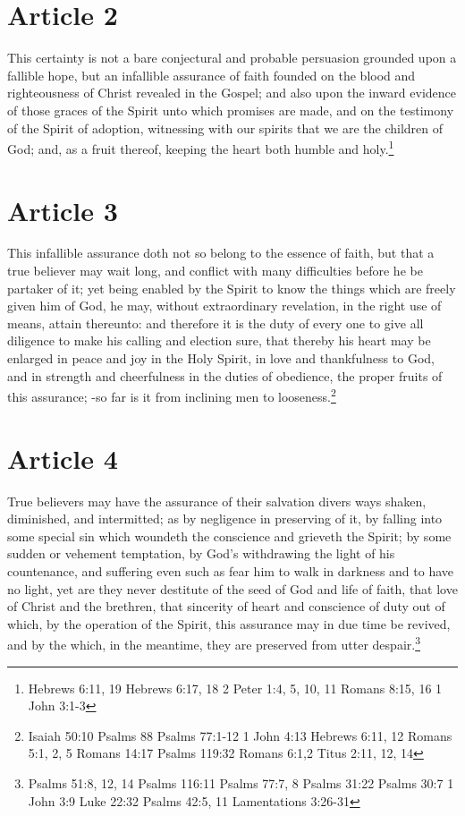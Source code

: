 \documentclass[12pt,letterpaper]{book}
\begin{document}
\section{Article 2}

This certainty is not a bare conjectural and probable persuasion grounded upon a fallible hope, but an infallible assurance of faith founded on the blood and righteousness of Christ revealed in the Gospel; and also upon the inward evidence of those graces of the Spirit unto which promises are made, and on the testimony of the Spirit of adoption, witnessing with our spirits that we are the children of God; and, as a fruit thereof, keeping the heart both humble and holy.\footnote{Hebrews 6:11, 19 Hebrews 6:17, 18 2 Peter 1:4, 5, 10, 11 Romans 8:15, 16 1 John 3:1-3}

\section{Article 3}

This infallible assurance doth not so belong to the essence of faith, but that a true believer may wait long, and conflict with many difficulties before he be partaker of it; yet being enabled by the Spirit to know the things which are freely given him of God, he may, without extraordinary revelation, in the right use of means, attain thereunto: and therefore it is the duty of every one to give all diligence to make his calling and election sure, that thereby his heart may be enlarged in peace and joy in the Holy Spirit, in love and thankfulness to God, and in strength and cheerfulness in the duties of obedience, the proper fruits of this assurance; -so far is it from inclining men to looseness.\footnote{Isaiah 50:10 Psalms 88 Psalms 77:1-12 1 John 4:13 Hebrews 6:11, 12 Romans 5:1, 2, 5 Romans 14:17 Psalms 119:32 Romans 6:1,2 Titus 2:11, 12, 14}

\section{Article 4}

True believers may have the assurance of their salvation divers ways shaken, diminished, and intermitted; as by negligence in preserving of it, by falling into some special sin which woundeth the conscience and grieveth the Spirit; by some sudden or vehement temptation, by God's withdrawing the light of his countenance, and suffering even such as fear him to walk in darkness and to have no light, yet are they never destitute of the seed of God and life of faith, that love of Christ and the brethren, that sincerity of heart and conscience of duty out of which, by the operation of the Spirit, this assurance may in due time be revived, and by the which, in the meantime, they are preserved from utter despair.\footnote{Psalms 51:8, 12, 14 Psalms 116:11 Psalms 77:7, 8 Psalms 31:22 Psalms 30:7 1 John 3:9 Luke 22:32 Psalms 42:5, 11 Lamentations 3:26-31}
\end{document}
